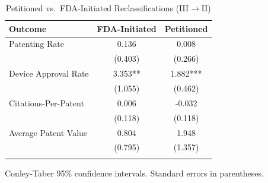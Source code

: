 \begin{table}[htbp]
\centering
\caption{Petitioned vs.\ FDA-Initiated Reclassifications (III$\to$II)}
\label{tab:petitioned_vs_fda}
\begin{tabular}{lcc}
\toprule
Outcome & FDA-Initiated & Petitioned \\
\midrule
Patenting Rate & 0.136 & 0.008 \\ 
 & (0.403) & (0.266) \\ 
\addlinespace
Device Approval Rate & 3.353** & 1.882*** \\ 
 & (1.055) & (0.462) \\ 
\addlinespace
Citations-Per-Patent & 0.006 & -0.032 \\ 
 & (0.118) & (0.118) \\ 
\addlinespace
Average Patent Value & 0.804 & 1.948 \\ 
 & (0.795) & (1.357) \\ 
\addlinespace
\bottomrule
\end{tabular}
\begin{tablenotes}\small
\item Conley-Taber 95\% confidence intervals. Standard errors in parentheses.
\end{tablenotes}
\end{table}